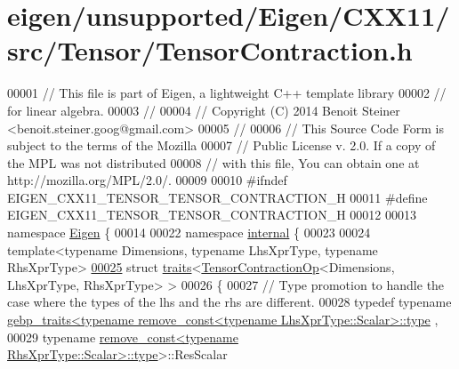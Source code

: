 \hypertarget{eigen_2unsupported_2_eigen_2_c_x_x11_2src_2_tensor_2_tensor_contraction_8h_source}{}\section{eigen/unsupported/\+Eigen/\+C\+X\+X11/src/\+Tensor/\+Tensor\+Contraction.h}
\label{eigen_2unsupported_2_eigen_2_c_x_x11_2src_2_tensor_2_tensor_contraction_8h_source}

\begin{DoxyCode}
00001 \textcolor{comment}{// This file is part of Eigen, a lightweight C++ template library}
00002 \textcolor{comment}{// for linear algebra.}
00003 \textcolor{comment}{//}
00004 \textcolor{comment}{// Copyright (C) 2014 Benoit Steiner <benoit.steiner.goog@gmail.com>}
00005 \textcolor{comment}{//}
00006 \textcolor{comment}{// This Source Code Form is subject to the terms of the Mozilla}
00007 \textcolor{comment}{// Public License v. 2.0. If a copy of the MPL was not distributed}
00008 \textcolor{comment}{// with this file, You can obtain one at http://mozilla.org/MPL/2.0/.}
00009 
00010 \textcolor{preprocessor}{#ifndef EIGEN\_CXX11\_TENSOR\_TENSOR\_CONTRACTION\_H}
00011 \textcolor{preprocessor}{#define EIGEN\_CXX11\_TENSOR\_TENSOR\_CONTRACTION\_H}
00012 
00013 \textcolor{keyword}{namespace }\hyperlink{namespace_eigen}{Eigen} \{
00014 
00022 \textcolor{keyword}{namespace }\hyperlink{namespaceinternal}{internal} \{
00023 
00024 \textcolor{keyword}{template}<\textcolor{keyword}{typename} Dimensions, \textcolor{keyword}{typename} LhsXprType, \textcolor{keyword}{typename} RhsXprType>
\hyperlink{struct_eigen_1_1internal_1_1traits_3_01_tensor_contraction_op_3_01_dimensions_00_01_lhs_xpr_type_00_01_rhs_xpr_type_01_4_01_4}{00025} \textcolor{keyword}{struct }\hyperlink{struct_eigen_1_1internal_1_1traits}{traits}<\hyperlink{class_eigen_1_1_tensor_contraction_op}{TensorContractionOp}<Dimensions, LhsXprType, RhsXprType> >
00026 \{
00027   \textcolor{comment}{// Type promotion to handle the case where the types of the lhs and the rhs are different.}
00028   \textcolor{keyword}{typedef} \textcolor{keyword}{typename} 
      \hyperlink{class_eigen_1_1internal_1_1gebp__traits}{gebp\_traits<typename remove\_const<typename LhsXprType::Scalar>::type}
      ,
00029                                \textcolor{keyword}{typename} 
      \hyperlink{group___sparse_core___module}{remove\_const<typename RhsXprType::Scalar>::type}>::ResScalar 

\end{DoxyCode}
